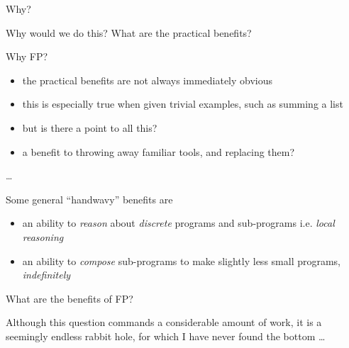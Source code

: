 \begin{frame}
\begin{block}{Why?}
\begin{center}
Why would we do this? What are the practical benefits?
\end{center}
\end{block}
\end{frame}

\begin{frame}
\begin{block}{Why FP?}
\begin{center}
\begin{itemize}
\item<1-> the practical benefits are not always immediately obvious
\item<2-> this is especially true when given trivial examples, such as summing a list
\item<3-> but is there a point to all this?
\item<4-> a benefit to throwing away familiar tools, and replacing them?
\end{itemize}
\end{center}
\end{block}
\end{frame}

\begin{frame}
\begin{center}
\ldots
\end{center}
\end{frame}

\begin{frame}
\begin{block}{Some general ``handwavy'' benefits are}
\begin{center}
\begin{itemize}
\item<1-> an ability to \emph{reason} about \emph{discrete} programs and sub-programs i.e. \emph{local reasoning}
\item<2-> an ability to \emph{compose} sub-programs to make slightly less small programs, \emph{indefinitely}
\end{itemize}
\end{center}
\end{block}
\end{frame}

\begin{frame}
\begin{block}{What are the benefits of FP?}
\begin{center}
Although this question commands a considerable amount of work, it is a seemingly endless rabbit hole, for which I have never found the bottom \ldots
\end{center}
\end{block}
\end{frame}
